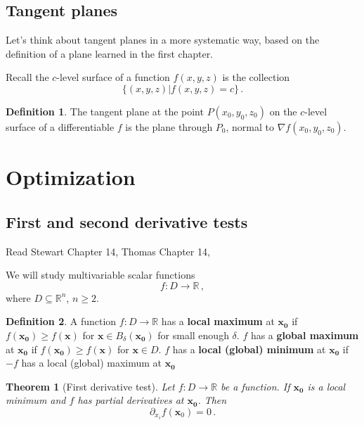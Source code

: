 \documentclass[
]{article}
\newtheorem{theorem}{Theorem}[section]
\theoremstyle{definition}
\newtheorem{definition}{Definition}[section]
\theoremstyle{definition}
\theoremstyle{definition}
\theoremstyle{definition}
\theoremstyle{remark}
\begin{document}
\hypertarget{tangent-planes}{%
\subsection{Tangent planes}\label{tangent-planes}}

Let's think about tangent planes in a more systematic way, based on the definition
of a plane learned in the first chapter.

Recall the \(c\)-level surface of a function \(f(x,y,z)\) is the collection
\begin{equation*}
    \{ (x,y,z) | f(x,y,z) = c \} \,.
\end{equation*}

\begin{definition}
The tangent plane at the point \(P(x_0, y_0, z_0)\) on the \(c\)-level surface of a differentiable \(f\)
is the plane through \(P_0\), normal to \(\nabla f (x_0, y_0, z_0)\).
\end{definition}

\newpage

\hypertarget{optimization}{%
\section{Optimization}\label{optimization}}

\hypertarget{first-and-second-derivative-tests}{%
\subsection{First and second derivative tests}\label{first-and-second-derivative-tests}}

Read Stewart Chapter 14, Thomas Chapter 14,

We will study multivariable scalar functions
\[ f: D \to \mathbb{R}\,,\]
where \(D\subseteq \mathbb{R}^n\), \(n\geq 2\).

\begin{definition}
A function \(f:D \to \mathbb{R}\) has a \textbf{local maximum} at \(\mathbf{x_0}\) if
\(f(\mathbf{x_0}) \geq f(\mathbf{x})\) for \(\mathbf{x} \in B_\delta(\mathbf{x_0})\) for small enough \(\delta\).
\(f\) has a \textbf{global maximum} at \(\mathbf{x_0}\) if
\(f(\mathbf{x_0}) \geq f(\mathbf{x})\) for \(\mathbf{x} \in D\).
\(f\) has a \textbf{local (global) minimum} at \(\mathbf{x_0}\) if
\(-f\) has a local (global) maximum at \(\mathbf{x_0}\)
\end{definition}

\begin{theorem}[First derivative test]
Let \(f:D \to \mathbb{R}\) be a function.
If \(\mathbf{x_0}\) is a local minimum and \(f\) has partial derivatives at \(\mathbf{x_0}\).
Then
\begin{equation*}
    \partial_{x_i} f(\mathbf{x}_0) = 0 \,.
\end{equation*}
\end{theorem}
\end{document}
